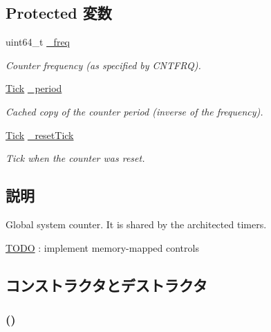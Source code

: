 \subsection*{Protected 変数}
\begin{DoxyCompactItemize}
\item 
uint64\_\-t \hyperlink{classGenericTimer_1_1SystemCounter_acf4c3a958c13bdb7f0115780a27dd982}{\_\-freq}
\begin{DoxyCompactList}\small\item\em Counter frequency (as specified by CNTFRQ). \item\end{DoxyCompactList}\item 
\hyperlink{base_2types_8hh_a5c8ed81b7d238c9083e1037ba6d61643}{Tick} \hyperlink{classGenericTimer_1_1SystemCounter_a8788f63b755d8a1d2a06a60f4738e970}{\_\-period}
\begin{DoxyCompactList}\small\item\em Cached copy of the counter period (inverse of the frequency). \item\end{DoxyCompactList}\item 
\hyperlink{base_2types_8hh_a5c8ed81b7d238c9083e1037ba6d61643}{Tick} \hyperlink{classGenericTimer_1_1SystemCounter_acaf0706f2d4dfb34660df9ceb3780897}{\_\-resetTick}
\begin{DoxyCompactList}\small\item\em Tick when the counter was reset. \item\end{DoxyCompactList}\end{DoxyCompactItemize}


\subsection{説明}
Global system counter. It is shared by the architected timers. \begin{Desc}
\item[\hyperlink{todo__todo000052}{TODO}]: implement memory-\/mapped controls \end{Desc}


\subsection{コンストラクタとデストラクタ}
\hypertarget{classGenericTimer_1_1SystemCounter_aa4747e677bcc91e4b46002512732f203}{
\subsubsection[{SystemCounter}]{ ()}}
\label{classGenericTimer_1_1SystemCounter_aa4747e677bcc91e4b46002512732f203}


